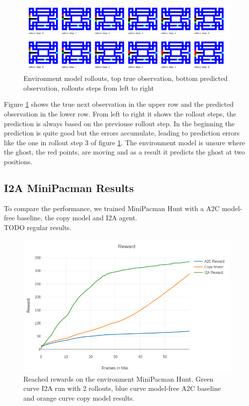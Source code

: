 \begin{figure}[H] 
  \centering   
  \includegraphics[width=\columnwidth]{./Images/env_model_rollouts.png}
  \caption{Environment model rollouts, top true observation, bottom predicted observation, rollouts steps from left to right} 
  \label{fig:environment_model_rollouts} 
\end{figure} 



Figure \ref{fig:environment_model_rollouts} shows the true next observation in the upper row and the predicted observation in the lower row. From left to right it shows the rollout steps, the prediction is always based on the previouse rollout step. In the beginning the prediction is quite good but the errors accumulate, leading to prediction errors like the one in rollout step 3 of figure \ref{fig:environment_model_rollouts}. The environment model is unsure where the ghost, the red points, are moving and as a result it predicts the ghost at two positions.



\subsection{I2A MiniPacman Results}


To compare the performance, we trained MiniPacman Hunt with a A2C model-free baseline, the copy model and I2A agent.\\


TODO regular results.\\
\begin{figure}[H] 
  \centering   
  \includegraphics[width=0.9\columnwidth]{./Images/regular_rewards_compare.png}
  \caption{Reached rewards on the environment MiniPacman Hunt. Green curve I2A run with 2 rollouts, blue curve model-free A2C baseline and orange curve copy model results.} 
  \label{fig:mini_pacman_hunt_rewards} 
\end{figure} 

